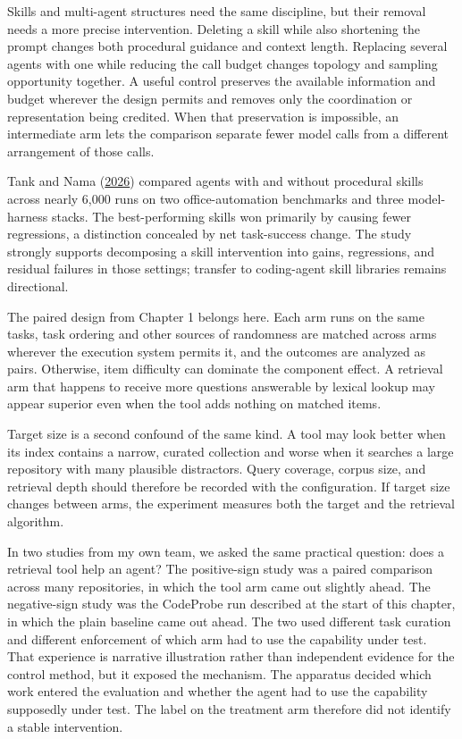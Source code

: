 Skills and multi-agent structures need the same discipline, but their removal needs a more precise intervention. Deleting a skill while also shortening the prompt changes both procedural guidance and context length. Replacing several agents with one while reducing the call budget changes topology and sampling opportunity together. A useful control preserves the available information and budget wherever the design permits and removes only the coordination or representation being credited. When that preservation is impossible, an intermediate arm lets the comparison separate fewer model calls from a different arrangement of those calls.

Tank and Nama (\href{https://arxiv.org/abs/2607.22520}{2026}) compared agents with and without procedural skills across nearly 6,000 runs on two office-automation benchmarks and three model-harness stacks. The best-performing skills won primarily by causing fewer regressions, a distinction concealed by net task-success change. The study strongly supports decomposing a skill intervention into gains, regressions, and residual failures in those settings; transfer to coding-agent skill libraries remains directional.

The paired design from Chapter 1 belongs here. Each arm runs on the same tasks, task ordering and other sources of randomness are matched across arms wherever the execution system permits it, and the outcomes are analyzed as pairs. Otherwise, item difficulty can dominate the component effect. A retrieval arm that happens to receive more questions answerable by lexical lookup may appear superior even when the tool adds nothing on matched items.

Target size is a second confound of the same kind. A tool may look better when its index contains a narrow, curated collection and worse when it searches a large repository with many plausible distractors. Query coverage, corpus size, and retrieval depth should therefore be recorded with the configuration. If target size changes between arms, the experiment measures both the target and the retrieval algorithm.

In two studies from my own team, we asked the same practical question: does a retrieval tool help an agent? The positive-sign study was a paired comparison across many repositories, in which the tool arm came out slightly ahead. The negative-sign study was the CodeProbe run described at the start of this chapter, in which the plain baseline came out ahead. The two used different task curation and different enforcement of which arm had to use the capability under test. That experience is narrative illustration rather than independent evidence for the control method, but it exposed the mechanism. The apparatus decided which work entered the evaluation and whether the agent had to use the capability supposedly under test. The label on the treatment arm therefore did not identify a stable intervention.

